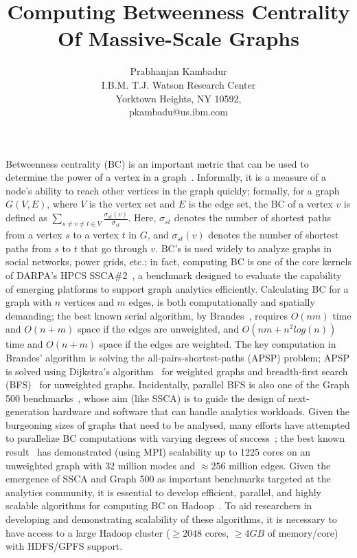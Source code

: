 \documentclass{article}
\begin{document}
%
\title{Computing Betweenness Centrality Of Massive-Scale Graphs}

\author{
Prabhanjan Kambadur \\
I.B.M. T.J. Watson Research Center \\
Yorktown Heights, NY 10592, \\
pkambadu@us.ibm.com}
\date{}

\maketitle

Betweenness centrality (BC) is an important metric that can be used to
determine the power of a vertex in a graph~\cite{Freeman77,Anthonisse71}.
%
Informally, it is a measure of a node's ability to reach other vertices in the
graph quickly; formally, for a graph $G(V,E)$, where $V$ is the vertex set and
$E$ is the edge set, the BC of a vertex $v$ is defined as
$\sum_{s\ne{}v\ne{}t\in{}V}{\frac{\sigma{}_{st}(v)}{\sigma{}_{st}}}$.
%
Here, $\sigma{}_{st}$ denotes the number of shortest paths from a vertex $s$ to
a vertex $t$ in $G$, and $\sigma{}_{st}(v)$ denotes the number of shortest
paths from $s$ to $t$ that go through $v$.
%
BC's is used widely to analyze graphs in social networks, power grids, etc.; in
fact, computing BC is one of the core kernels of DARPA's HPCS
SSCA\#2~\cite{ssca_matlab}, a benchmark designed to evaluate the capability of
emerging platforms to support graph analytics efficiently.
%
Calculating BC for a graph with $n$ vertices and $m$ edges, is both
computationally and spatially demanding; the best known serial algorithm, by
Brandes~\cite{brandes01:_mathsoc}, requires $O(nm)$ time and $O(n+m)$ space if
the edges are unweighted, and $O(nm+n^2log(n))$ time and $O(n+m)$ space if the
edges are weighted.
%
The key computation in Brandes' algorithm is solving the
all-pairs-shortest-paths (APSP) problem; APSP is solved using Dijkstra's
algorithm~\cite{dijkstra59} for weighted graphs and breadth-first search
(BFS)~\cite{clr90} for unweighted graphs.
%
Incidentally, parallel BFS is also one of the Graph 500
benchmarks~\cite{graph500}, whose aim (like SSCA) is to guide the design of
next-generation hardware and software that can handle analytics workloads.
%
Given the burgeoning sizes of graphs that need to be analysed, many efforts
have attempted to parallelize BC computations with varying degrees of
success~\cite{Madduri:2009,Santos:2006,edmonds-hipc-2010,Yang05,buluc-2010};
the best known result~\cite{buluc-2010} has demonstrated (using MPI)
scalability up to 1225 cores on an unweighted graph with $32$ million modes and
$\approx{}256$ million edges.
%
Given the emergence of SSCA and Graph 500 as important benchmarks targeted at
the analytics community, it is essential to develop efficient, parallel, and 
highly scalable algorithms for computing BC on Hadoop~\cite{Hadoop}.
%
To aid researchers in developing and demonstrating scalability of these
algorithms, it is necessary to have access to a large Hadoop cluster
($\ge{}2048{}$ cores, $\ge{}4GB$ of memory/core) with HDFS/GPFS support.





\end{document}
